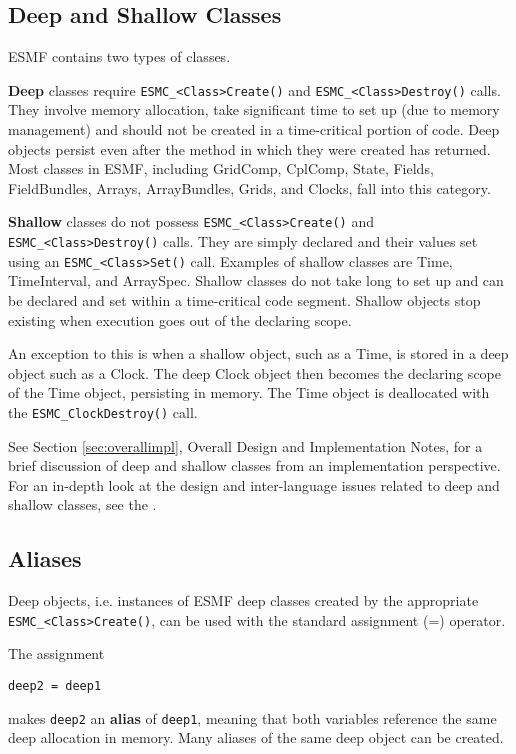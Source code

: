 \subsection{Deep and Shallow Classes}
\label{sec:deepshallow}

ESMF contains two types of classes.

{\bf Deep} classes require
{\tt ESMC\_<Class>Create()} and {\tt ESMC\_<Class>Destroy()} calls.
They involve memory allocation, take significant time to set up (due to
memory management) and should not be created in a time-critical portion of code.
Deep objects persist even after the method in which they were created has
returned. Most classes in ESMF, including GridComp, CplComp, State, Fields, FieldBundles, Arrays, ArrayBundles, Grids, and Clocks, fall into this category.

{\bf Shallow} classes do not possess {\tt ESMC\_<Class>Create()}
and {\tt ESMC\_<Class>Destroy()} calls.  They are simply declared
and their values set using an {\tt ESMC\_<Class>Set()} call.  
Examples of shallow classes are Time, TimeInterval, and ArraySpec.
Shallow classes do not take long to set up and can be declared and set within
a time-critical code segment.  Shallow objects stop existing when execution
goes out of the declaring scope.

An exception to this is when a shallow object, such as a Time, 
is stored in a deep object such as a Clock.  The deep Clock object then
becomes the declaring scope of the Time object, persisting in memory.
The Time object is deallocated with the {\tt ESMC\_ClockDestroy()} call.

See Section \ref{sec:overallimpl}, Overall Design and Implementation 
Notes, for a brief discussion of deep and shallow classes from 
an implementation perspective.  For an in-depth look at the design
 and inter-language issues related to deep and shallow classes,
see the .

\subsection{Aliases}
\label{sec:aliases}

Deep objects, i.e. instances of ESMF deep classes created by the appropriate
{\tt ESMC\_<Class>Create()}, can be used with the standard assignment (=)
operator.

The assignment
\begin{verbatim}
deep2 = deep1
\end{verbatim}
makes {\tt deep2} an {\bf alias} of {\tt deep1}, meaning that both variables
reference the same deep allocation in memory. Many aliases of the same deep
object can be created.

